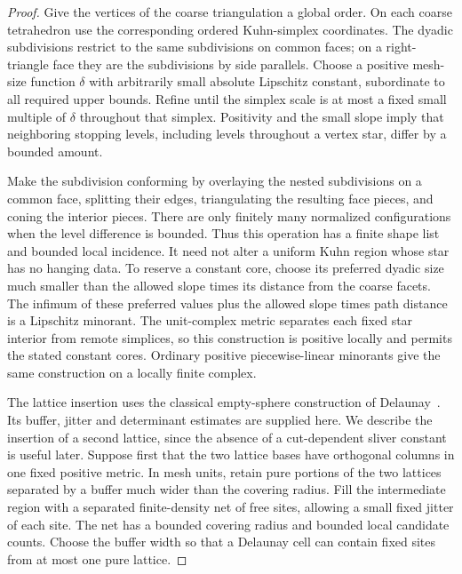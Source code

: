 \documentclass[11pt]{article}
\numberwithin{equation}{section}
\theoremstyle{definition}
\theoremstyle{remark}
\begin{document}
\begin{proof}
Give the vertices of the coarse triangulation a global order.  On each
coarse tetrahedron use the corresponding ordered Kuhn-simplex
coordinates.  The dyadic subdivisions restrict to the same subdivisions
on common faces; on a right-triangle face they are the subdivisions by
side parallels.  Choose a positive mesh-size function $\delta$ with
arbitrarily small absolute Lipschitz constant, subordinate to all
required upper bounds.  Refine until the simplex scale is at most a
fixed small multiple of $\delta$ throughout that simplex.  Positivity
and the small slope imply that neighboring stopping levels, including
levels throughout a vertex star, differ by a bounded amount.

Make the subdivision conforming by overlaying the nested subdivisions
on a common face, splitting their edges, triangulating the resulting
face pieces, and coning the interior pieces.  There are only finitely
many normalized configurations when the level difference is bounded.
Thus this operation has a finite shape list and bounded local
incidence.  It need not alter a uniform Kuhn region whose star has no
hanging data.  To reserve a constant core, choose its preferred dyadic
size much smaller than the allowed slope times its distance from the
coarse facets.  The infimum of these preferred values plus the allowed
slope times path distance is a Lipschitz minorant.  The unit-complex
metric separates each fixed star interior from remote simplices, so
this construction is positive locally and permits the stated constant
cores.  Ordinary positive piecewise-linear minorants give the same
construction on a locally finite complex.

The lattice insertion uses the classical empty-sphere construction
of Delaunay~\cite{Delaunay1934}.  Its buffer, jitter and determinant
estimates are supplied here.  We describe the insertion of a second lattice,
since the absence of a
cut-dependent sliver constant is useful later.  Suppose first that the
two lattice bases have orthogonal columns in one fixed positive
metric.  In mesh units, retain pure portions of the two lattices
separated by a buffer much wider than the covering radius.  Fill the
intermediate region with a separated finite-density net of free sites,
allowing a small fixed jitter of each site.  The net has a bounded
covering radius and bounded local candidate counts.  Choose the
buffer width so that a Delaunay cell can contain fixed sites from at
most one pure lattice.


\end{proof}
\end{document}
